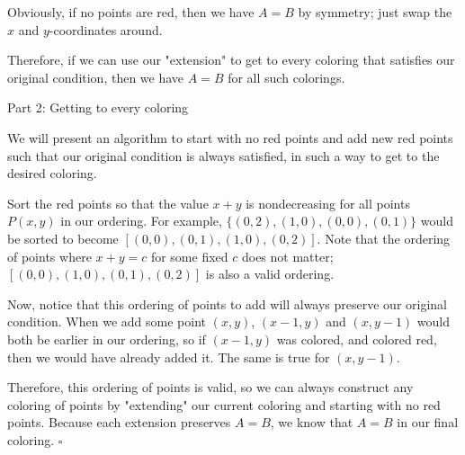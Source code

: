 \begin{solution}[Ritwin]
    Obviously, if no points are red, then we have $A=B$ by symmetry; just swap
    the $x$ and $y$-coordinates around.
    
    Therefore, if we can use our "extension" to get to every coloring that
    satisfies our original condition, then we have $A=B$ for all such colorings.
    
    \large Part 2: Getting to every coloring \small
    
    We will present an algorithm to start with no red points and add new red
    points such that our original condition is always satisfied, in such a way
    to get to the desired coloring.
    
    Sort the red points so that the value $x+y$ is nondecreasing for all points
    $P(x,y)$ in our ordering. For example, $\{(0,2),(1,0),(0,0),(0,1)\}$ would
    be sorted to become $[(0,0),(0,1),(1,0),(0,2)]$. Note that the ordering of
    points where $x+y=c$ for some fixed $c$ does not matter;
    $[(0,0),(1,0),(0,1),(0,2)]$ is also a valid ordering.
    
    Now, notice that this ordering of points to add will always preserve our
    original condition. When we add some point $(x,y)$, $(x-1,y)$ and $(x,y-1)$
    would both be earlier in our ordering, so if $(x-1,y)$ was colored, and
    colored red, then we would have already added it. The same is true for $(x,y-1)$.
    
    Therefore, this ordering of points is valid, so we can always construct any
    coloring of points by "extending" our current coloring and starting with no
    red points. Because each extension preserves $A=B$, we know that $A=B$ in
    our final coloring. $\square$
\end{solution}

